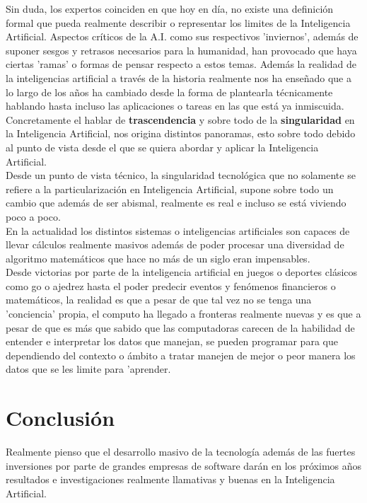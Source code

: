 \documentclass[11pt]{article}
\begin{document}
Sin duda, los expertos coinciden en que hoy en día, no existe una definición formal que pueda realmente describir o representar los limites de la Inteligencia Artificial. Aspectos críticos de la A.I. como sus respectivos 'inviernos', además de suponer sesgos y retrasos necesarios para la humanidad, han provocado que haya ciertas 'ramas' o formas de pensar respecto a estos temas. Además la realidad de la inteligencias artificial a través de la historia realmente nos ha enseñado que a lo largo de los años ha cambiado desde la forma de plantearla técnicamente hablando hasta incluso las aplicaciones o tareas en las que está ya inmiscuida.\\ 

Concretamente el hablar de \textbf{trascendencia} y sobre todo de la \textbf{singularidad} en la Inteligencia Artificial, nos origina distintos panoramas, esto sobre todo debido al punto de vista desde el que se quiera abordar y aplicar la Inteligencia Artificial.\\

Desde un punto de vista técnico, la singularidad tecnológica que no solamente se refiere a la particularización en Inteligencia Artificial, supone sobre todo un cambio que además de ser abismal, realmente es real e incluso se está viviendo poco a poco.\\

En la actualidad los distintos sistemas o inteligencias artificiales son capaces de llevar cálculos realmente masivos además de poder procesar una diversidad de algoritmo matemáticos que hace no más de un siglo eran impensables. \\

Desde victorias por parte de la inteligencia artificial en juegos o deportes clásicos como go o ajedrez hasta el poder predecir eventos y fenómenos financieros o matemáticos, la realidad es que a pesar de que tal vez no se tenga una 'conciencia' propia, el computo ha llegado a fronteras realmente nuevas y es que a pesar de que es más que sabido que las computadoras carecen de la habilidad de entender e interpretar los datos que manejan, se pueden programar para que dependiendo del contexto o ámbito a tratar manejen de mejor o peor manera los datos que se les limite para 'aprender.


\section{Conclusión}

Realmente pienso que el desarrollo masivo de la tecnología además de las fuertes inversiones por parte de grandes empresas de software darán en los próximos años resultados e investigaciones realmente llamativas y buenas en la Inteligencia Artificial. \\
\end{document}
